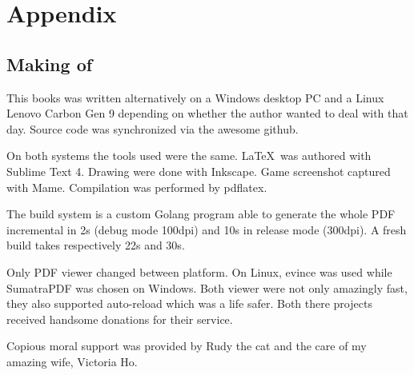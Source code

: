 \chapter{Appendix} 

\section{Making of}

This books was written alternatively on a Windows desktop PC and a Linux Lenovo Carbon Gen 9 depending on whether the author wanted to deal with  that day. Source code was synchronized via the awesome github.

On both systems the tools used were the same. \LaTeX\ was authored with Sublime Text 4. Drawing were done with Inkscape. Game screenshot captured with Mame. Compilation was performed by pdflatex.

The build system is a custom Golang program able to generate the whole PDF incremental in 2s (debug mode 100dpi) and 10s in release mode (300dpi). A fresh build takes respectively 22s and 30s.

Only PDF viewer changed between platform. On Linux, evince was used while SumatraPDF was chosen on Windows. Both viewer were not only amazingly fast, they also supported auto-reload which was a life safer. Both there projects received handsome donations for their service.

Copious moral support was provided by Rudy the cat and the care of my amazing wife, Victoria Ho.
